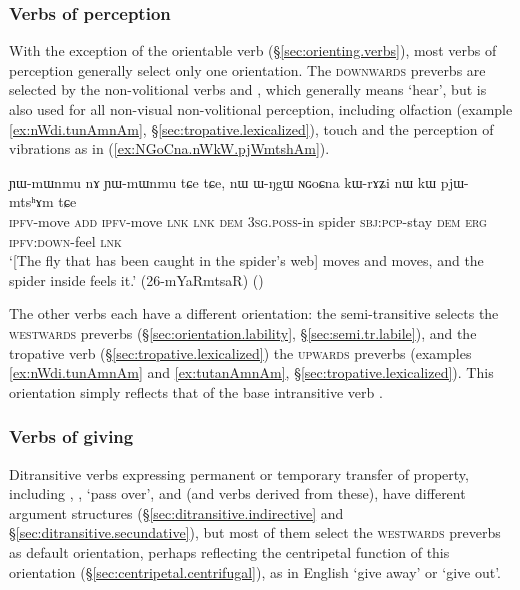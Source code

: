 \subsubsection{Verbs of perception}  \label{sec:preverb.perception} 
With the exception of the orientable verb  (§\ref{sec:orienting.verbs}), most verbs of perception generally select only one orientation. The  \textsc{downwards} preverbs are selected by the non-volitional  verbs  and , which generally means `hear', but is also used for all non-visual  non-volitional perception, including olfaction (example \ref{ex:nWdi.tunAmnAm}, §\ref{sec:tropative.lexicalized}), touch and the perception of vibrations as in  (\ref{ex:NGoCna.nWkW.pjWmtshAm}).
 
\begin{exe}
\ex \label{ex:NGoCna.nWkW.pjWmtshAm}
\gll ɲɯ-mɯnmu nɤ ɲɯ-mɯnmu tɕe tɕe, nɯ ɯ-ŋgɯ ɴɢoɕna kɯ-rɤʑi nɯ kɯ pjɯ-mtsʰɤm tɕe  \\
\textsc{ipfv}-move \textsc{add} \textsc{ipfv}-move  \textsc{lnk} \textsc{lnk} \textsc{dem} \textsc{3sg}.\textsc{poss}-in spider \textsc{sbj}:\textsc{pcp}-stay \textsc{dem} \textsc{erg} \textsc{ipfv}:\textsc{down}-feel \textsc{lnk} \\
\glt `[The fly that has been caught in the spider's web] moves and moves, and the spider inside feels it.' (26-mYaRmtsaR)
()
\end{exe}

The other verbs each have a different orientation: the semi-transitive  selects the \textsc{westwards} preverbs (§\ref{sec:orientation.lability}, §\ref{sec:semi.tr.labile}), and the tropative verb  (§\ref{sec:tropative.lexicalized}) the \textsc{upwards} preverbs (examples \ref{ex:nWdi.tunAmnAm} and \ref{ex:tutanAmnAm}, §\ref{sec:tropative.lexicalized}). This orientation simply reflects that of the base intransitive verb .

\subsubsection{Verbs of giving} \label{sec:preverb.giving}
Ditransitive verbs expressing permanent or temporary transfer of property, including ,  , `pass over',  and  (and verbs derived from these), have different argument structures (§\ref{sec:ditransitive.indirective} and §\ref{sec:ditransitive.secundative}), but most of them select the \textsc{westwards} preverbs as default orientation, perhaps reflecting the centripetal function of this orientation (§\ref{sec:centripetal.centrifugal}), as in English `give away' or `give out'.

